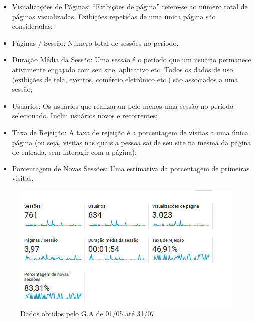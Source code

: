 \begin{itemize}
\item Visualizações de Páginas: ``Exibições de página'' refere-se ao número total de páginas visualizadas. Exibições repetidas de uma única página são consideradas;
\item Páginas / Sessão: Número total de sessões no período.
\item Duração Média da Sessão: Uma sessão é o período que um usuário permanece ativamente engajado com seu site, aplicativo etc. Todos os dados de uso (exibições de tela, eventos, comércio eletrônico etc.) são associados a uma sessão;
\item Usuários: Os usuários que realizaram pelo menos uma sessão no período selecionado. Inclui usuários novos e recorrentes;
\item Taxa de Rejeição: A taxa de rejeição é a porcentagem de visitas a uma única página (ou seja, visitas nas quais a pessoa sai de seu site na mesma da página de entrada, sem interagir com a página);
\item Porcentagem de Novas Sessões: Uma estimativa da porcentagem de primeiras visitas.
\end{itemize}

\begin{figure}[htb]
\centering
\includegraphics[width=15cm]{figuras/analytics_1interacao_dados}
\caption{\label{fig:analytics_1interacao_dados} Dados obtidos pelo G.A de 01/05 até 31/07}
\end{figure}

